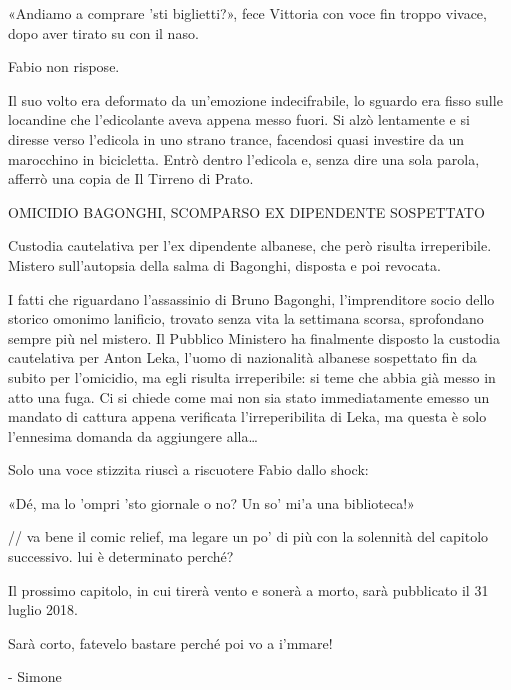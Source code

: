 «Andiamo a comprare 'sti biglietti?», fece Vittoria con voce fin troppo vivace, dopo aver tirato su con il naso.

Fabio non rispose.

Il suo volto era deformato da un'emozione indecifrabile, lo sguardo era fisso sulle locandine che l'edicolante aveva appena messo fuori. Si alzò lentamente e si diresse verso l'edicola in uno strano trance, facendosi quasi investire da un marocchino in bicicletta. Entrò dentro l'edicola e, senza dire una sola parola, afferrò una copia de Il Tirreno di Prato.

OMICIDIO BAGONGHI, SCOMPARSO EX DIPENDENTE SOSPETTATO

Custodia cautelativa per l'ex dipendente albanese, che però risulta irreperibile. Mistero sull'autopsia della salma di Bagonghi, disposta e poi revocata.

I fatti che riguardano l'assassinio di Bruno Bagonghi, l'imprenditore socio dello storico omonimo lanificio, trovato senza vita la settimana scorsa, sprofondano sempre più nel mistero. Il Pubblico Ministero ha finalmente disposto la custodia cautelativa per Anton Leka, l'uomo di nazionalità albanese sospettato fin da subito per l'omicidio, ma egli risulta irreperibile: si teme che abbia già messo in atto una fuga. Ci si chiede come mai non sia stato immediatamente emesso un mandato di cattura appena verificata l'irreperibilita di Leka, ma questa è solo l'ennesima domanda da aggiungere alla\ldots

Solo una voce stizzita riuscì a riscuotere Fabio dallo shock:

«Dé, ma lo 'ompri 'sto giornale o no? Un so' mi'a una biblioteca!»

// va bene il comic relief, ma legare un po' di più con la solennità del capitolo successivo. lui è determinato perché?

Il prossimo capitolo, in cui tirerà vento e sonerà a morto, sarà pubblicato il 31 luglio 2018.

Sarà corto, fatevelo bastare perché poi vo a i'mmare!

- Simone
